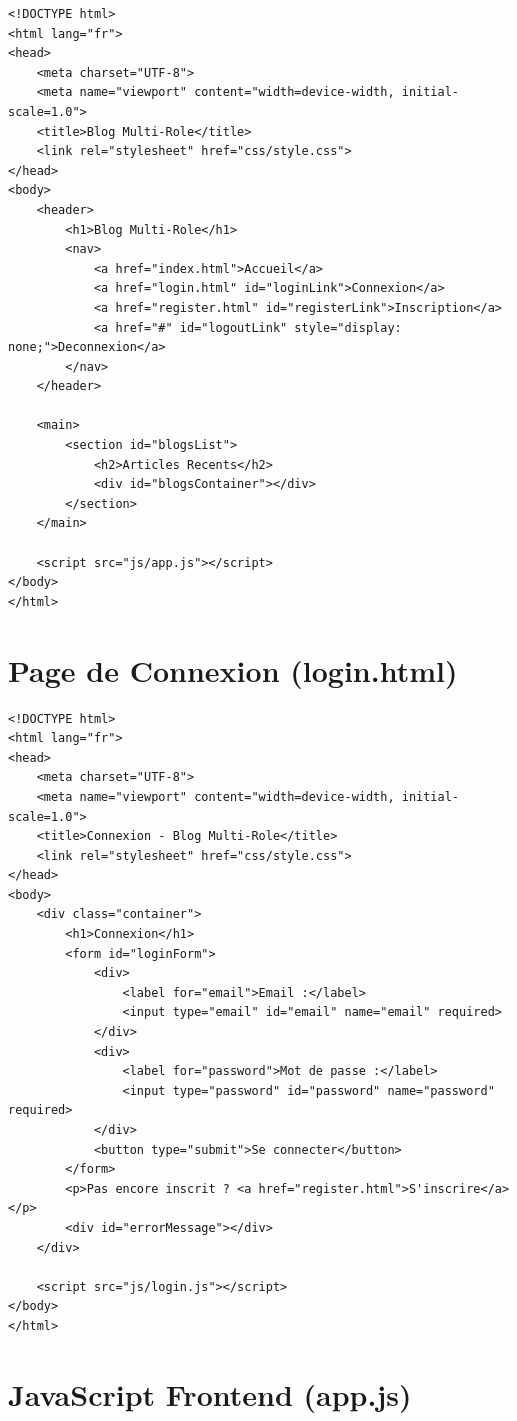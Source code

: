 \documentclass[a4paper,12pt]{book}
\begin{document}
\begin{lstlisting}[style=html, caption=public/index.html - Page d'accueil]
<!DOCTYPE html>
<html lang="fr">
<head>
    <meta charset="UTF-8">
    <meta name="viewport" content="width=device-width, initial-scale=1.0">
    <title>Blog Multi-Role</title>
    <link rel="stylesheet" href="css/style.css">
</head>
<body>
    <header>
        <h1>Blog Multi-Role</h1>
        <nav>
            <a href="index.html">Accueil</a>
            <a href="login.html" id="loginLink">Connexion</a>
            <a href="register.html" id="registerLink">Inscription</a>
            <a href="#" id="logoutLink" style="display: none;">Deconnexion</a>
        </nav>
    </header>

    <main>
        <section id="blogsList">
            <h2>Articles Recents</h2>
            <div id="blogsContainer"></div>
        </section>
    </main>

    <script src="js/app.js"></script>
</body>
</html>
\end{lstlisting}

\section{Page de Connexion (login.html)}

\begin{lstlisting}[style=html, caption=public/login.html - Page de connexion]
<!DOCTYPE html>
<html lang="fr">
<head>
    <meta charset="UTF-8">
    <meta name="viewport" content="width=device-width, initial-scale=1.0">
    <title>Connexion - Blog Multi-Role</title>
    <link rel="stylesheet" href="css/style.css">
</head>
<body>
    <div class="container">
        <h1>Connexion</h1>
        <form id="loginForm">
            <div>
                <label for="email">Email :</label>
                <input type="email" id="email" name="email" required>
            </div>
            <div>
                <label for="password">Mot de passe :</label>
                <input type="password" id="password" name="password" required>
            </div>
            <button type="submit">Se connecter</button>
        </form>
        <p>Pas encore inscrit ? <a href="register.html">S'inscrire</a></p>
        <div id="errorMessage"></div>
    </div>

    <script src="js/login.js"></script>
</body>
</html>
\end{lstlisting}

\section{JavaScript Frontend (app.js)}
\end{document}
